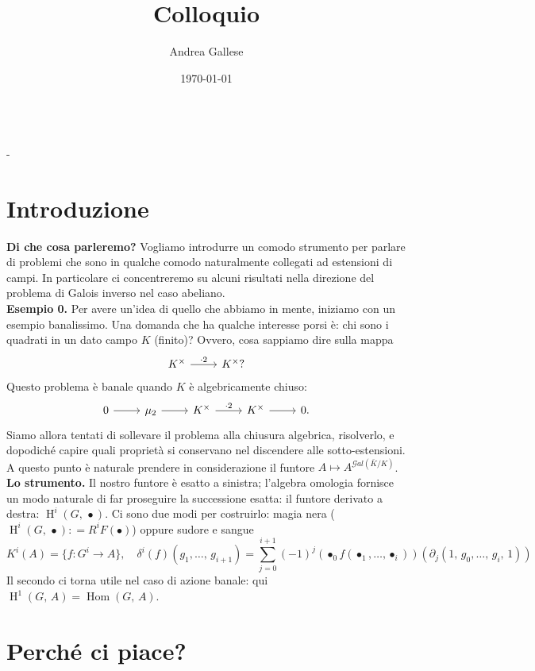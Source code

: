 \documentclass[a4paper]{article}
\title{Colloquio}\let\Title\@title
\author{Andrea Gallese}\let\Author\@author
\date{\today}\let\Date\@date
\newcommand{\Intitola}{\begin{center}
		\vspace*{0,5 cm}
		{\Huge \textsc{\Title}} \\
		\vspace{0,5 cm}
		\texttt{\Author} \hspace{0.5cm} - \hspace{0.5cm} \texttt{\Date}
		\thispagestyle{empty}
		\vspace{0,7 cm}
\end{center}}
\theoremstyle{remark}
\theoremstyle{definition}
\newcommand{\Gal}[1]{\mathcal{G}al\left( #1 \right)}
\DeclareMathOperator{\Hom}{Hom}
\DeclareMathOperator{\HH}{H}
\begin{document}
\Intitola
\small

\section*{Introduzione}

\textbf{Di che cosa parleremo?} Vogliamo introdurre un comodo strumento per parlare di problemi che sono in qualche comodo naturalmente collegati ad estensioni di campi. In particolare ci concentreremo su alcuni risultati nella direzione del problema di Galois inverso nel caso abeliano. \\

\textbf{Esempio 0.} Per avere un'idea di quello che abbiamo in mente, iniziamo con un esempio banalissimo. Una domanda che ha qualche interesse porsi è: chi sono i quadrati in un dato campo $ K $ (finito)? Ovvero, cosa sappiamo dire sulla mappa
\[ \begin{tikzcd}
K^\times \rar["\cdot 2"] & K^\times?
\end{tikzcd} \]
Questo problema è banale quando $ K $ è algebricamente chiuso:
\[ \begin{tikzcd}
0 \rar & \mu_2 \rar & K^\times \rar["\cdot 2"] & K^\times \rar & 0.
\end{tikzcd} \]
Siamo allora tentati di sollevare il problema alla chiusura algebrica, risolverlo, e dopodiché capire quali proprietà si conservano nel discendere alle sotto-estensioni. A questo punto è naturale prendere in considerazione il funtore $ A \mapsto A^{\Gal{\bar{K}/K}} $. \\

\textbf{Lo strumento.} Il nostro funtore è esatto a sinistra; l'algebra omologia fornisce un modo naturale di far proseguire la successione esatta: il funtore derivato a destra: $ \HH^i(G, \, \bullet) $. Ci sono due modi per costruirlo: magia nera ($ \HH^i(G, \, \bullet) \colon = R^iF(\bullet) $) oppure sudore e sangue
\[ K^i(A) = \{ f \colon G^i \to A \}, \quad \delta^i(f) (g_1, \dots, \, g_{i+1}) = \sum_{j=0}^{i+1} (-1)^j (\bullet_0 f(\bullet_1, \dots, \bullet_{i}))(\partial_j(1, \, g_0, \dots, \, g_{i}, \, 1))  \]
Il secondo ci torna utile nel caso di azione banale: qui $ \HH^1(G, \, A) = \Hom(G, \, A) $. \\

\section*{Perché ci piace?}
\end{document}
